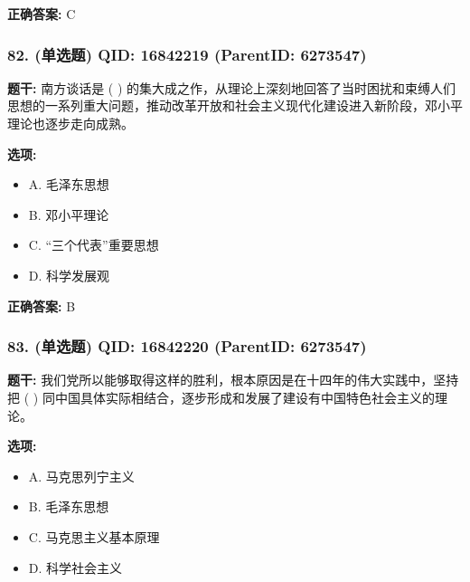\documentclass[12pt,UTF8]{ctexart}
\begin{document}
\textbf{正确答案:}
C

\vspace{0.3em}\hrulefill\vspace{0.7em}

\subsubsection*{82. (单选题) \small QID: 16842219 (ParentID: 6273547)}

\textbf{题干:}
南方谈话是 ( ) 的集大成之作，从理论上深刻地回答了当时困扰和束缚人们思想的一系列重大问题，推动改革开放和社会主义现代化建设进入新阶段，邓小平理论也逐步走向成熟。



\textbf{选项:}
\begin{itemize}[leftmargin=*]

  \item A. 毛泽东思想

  \item B. 邓小平理论

  \item C. “三个代表”重要思想

  \item D. 科学发展观

\end{itemize}

\textbf{正确答案:}
B

\vspace{0.3em}\hrulefill\vspace{0.7em}

\subsubsection*{83. (单选题) \small QID: 16842220 (ParentID: 6273547)}

\textbf{题干:}
我们党所以能够取得这样的胜利，根本原因是在十四年的伟大实践中，坚持把 ( ) 同中国具体实际相结合，逐步形成和发展了建设有中国特色社会主义的理论。



\textbf{选项:}
\begin{itemize}[leftmargin=*]

  \item A. 马克思列宁主义

  \item B. 毛泽东思想

  \item C. 马克思主义基本原理

  \item D. 科学社会主义

\end{itemize}
\end{document}
